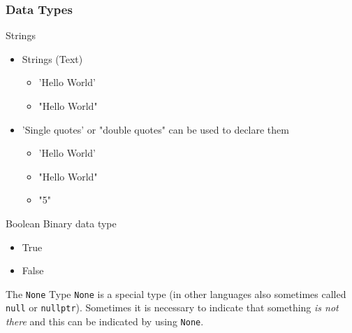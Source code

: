 \documentclass[10pt, a4paper]{beamer} %
\begin{document}
\begin{frame}[c, allowframebreaks]\frametitle{Data Types}
  \begin{block}{Strings}
  \begin{itemize}
    \item Strings (Text)
    \begin{itemize}
      \item {\color{blue}'Hello World'}
      \item {\color{red}"Hello World"}
    \end{itemize}
    \item {\color{blue} 'Single quotes'} or {\color{red} "double quotes"} can be used to declare them
    \begin{itemize}
      \item 'Hello World'
      \item "Hello World"
      \item "5"
    \end{itemize}
  \end{itemize}
  \end{block}
  \begin{block}{Boolean}
    Binary data type
    \begin{itemize}
      \item True
      \item False
    \end{itemize}
  \end{block}
  \framebreak
    The \texttt{None} Type
    \vspace{2ex}
    \texttt{None} is a special type (in other languages also sometimes called \texttt{null} or \texttt{nullptr}).
    Sometimes it is necessary to indicate that something \textit{is not there} and this can be indicated by using \texttt{None}.


\end{frame}
\end{document}
